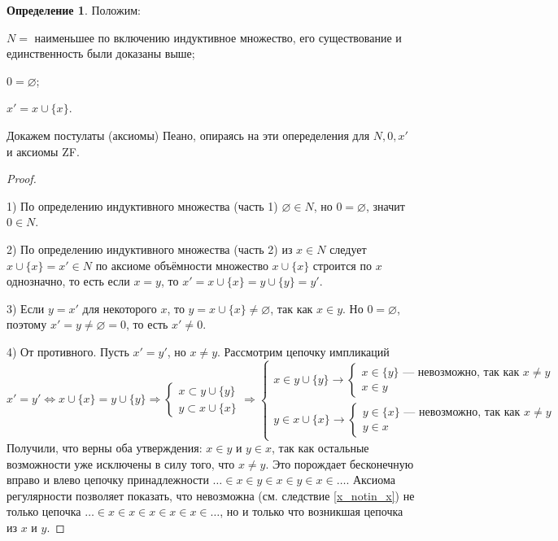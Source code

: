 \documentclass[12pt,oneside]{article}
\theoremstyle{definition}
\newtheorem{definition}{Определение}
\begin{document}
\begin{definition}
Положим: 

$N = $ наименьшее по включению индуктивное множество, его существование и единственность были доказаны выше; 

$0 = \varnothing$; 

$x'=x\cup\{x\}$.
\end{definition}

Докажем постулаты (аксиомы) Пеано, опираясь на эти опеределения для $N, 0, x'$ и аксиомы ZF.
\begin{proof}{}\label{proof_nat}

1) По определению индуктивного множества (часть 1) $\varnothing\in N$, но $0=\varnothing$, значит $0\in N$.

2) По определению индуктивного множества (часть 2) из $x\in N$ следует $x\cup\{x\}=x'\in N$ по аксиоме объёмности  множество $x\cup \{x\}$ строится по $x$ однозначно, то есть если $x=y$, то $x' = x\cup \{x\} = y\cup \{y\} = y'$.

3) Если $y = x'$ для некоторого $x$, то $y = x\cup \{x\}\neq \varnothing$, так как $x\in y$. Но $0=\varnothing$, поэтому $x' = y \neq \varnothing = 0$, то есть $x'\neq 0$.

4) От противного. Пусть $x' = y'$, но $x\neq y$. Рассмотрим цепочку импликаций 
$x' = y' \Longleftrightarrow x\cup \{x\} = y\cup \{y\} \Longrightarrow 
\begin{cases}
     x\subset y\cup \{y\}  \\
     y\subset x\cup \{x\} 
\end{cases} \Longrightarrow
\begin{cases}
     x\in y\cup \{y\}  \longrightarrow 
     \begin{cases}
         x\in \{y\} \textrm{ --- невозможно, так как } x\neq y  \\
         x\in y
     \end{cases}\\
     y\in x\cup \{x\}  \longrightarrow
     \begin{cases}
         y\in \{x\} \textrm{ --- невозможно, так как } x\neq y  \\
         y\in x
     \end{cases}
\end{cases}
$
Получили, что верны оба утверждения: $x\in y$ и $y\in x$, так как остальные возможности уже исключены в силу того, что $x\neq y$. Это порождает бесконечную вправо и влево цепочку принадлежности $\dots \in x\in y\in x\in y\in x\in \dots$. Аксиома регулярности позволяет показать, что невозможна (см. следствие \ref{x_notin_x}) не только цепочка $\dots \in x\in x\in x\in x\in x\in \dots$, но и только что возникшая цепочка из $x$ и $y$.


\end{proof}
\end{document}
